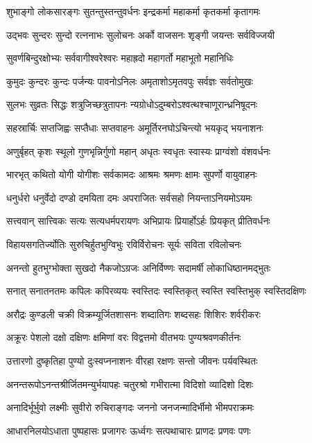 \twolineshloka
{शुभाङ्गो लोकसारङ्गः सुतन्तुस्तन्तुवर्धनः}
{इन्द्रकर्मा महाकर्मा कृतकर्मा कृतागमः}

\twolineshloka
{उद्भवः सुन्दरः सुन्दो रत्ननाभः सुलोचनः}
{अर्को वाजसनः शृङ्गी जयन्तः सर्वविज्जयी}

\twolineshloka
{सुवर्णबिन्दुरक्षोभ्यः सर्ववागीश्वरेश्वरः}
{महाह्रदो महागर्तो महाभूतो महानिधिः}

\twolineshloka
{कुमुदः कुन्दरः कुन्दः पर्जन्यः पावनोऽनिलः}
{अमृताशोऽमृतवपुः सर्वज्ञः सर्वतोमुखः}

\twolineshloka
{सुलभः सुव्रतः सिद्धः शत्रुजिच्छत्रुतापनः}
{न्यग्रोधोऽदुम्बरोऽश्वत्थश्चाणूरान्ध्रनिषूदनः}

\twolineshloka
{सहस्रार्चिः सप्तजिह्वः सप्तैधाः सप्तवाहनः}
{अमूर्तिरनघोऽचिन्त्यो भयकृद् भयनाशनः}

\twolineshloka
{अणुर्बृहत् कृशः स्थूलो गुणभृन्निर्गुणो महान्}
{अधृतः स्वधृतः स्वास्यः प्राग्वंशो वंशवर्धनः}

\twolineshloka
{भारभृत् कथितो योगी योगीशः सर्वकामदः}
{आश्रमः श्रमणः क्षामः सुपर्णो वायुवाहनः}

\twolineshloka
{धनुर्धरो धनुर्वेदो दण्डो दमयिता दमः}
{अपराजितः सर्वसहो नियन्ताऽनियमोऽयमः}

\twolineshloka
{सत्त्ववान् सात्त्विकः सत्यः सत्यधर्मपरायणः}
{अभिप्रायः प्रियार्होऽर्हः प्रियकृत् प्रीतिवर्धनः}

\twolineshloka
{विहायसगतिर्ज्योतिः सुरुचिर्हुतभुग्विभुः}
{रविर्विरोचनः सूर्यः सविता रविलोचनः}

\twolineshloka
{अनन्तो हुतभुग्भोक्ता सुखदो नैकजोऽग्रजः}
{अनिर्विण्णः सदामर्षी लोकाधिष्ठानमद्भुतः}

\twolineshloka
{सनात् सनातनतमः कपिलः कपिरव्ययः}
{स्वस्तिदः स्वस्तिकृत् स्वस्ति स्वस्तिभुक् स्वस्तिदक्षिणः}

\twolineshloka
{अरौद्रः कुण्डली चक्री विक्रम्यूर्जितशासनः}
{शब्दातिगः शब्दसहः शिशिरः शर्वरीकरः}

\twolineshloka
{अक्रूरः पेशलो दक्षो दक्षिणः क्षमिणां वरः}
{विद्वत्तमो वीतभयः पुण्यश्रवणकीर्तनः}

\twolineshloka
{उत्तारणो दुष्कृतिहा पुण्यो दुःस्वप्ननाशनः}
{वीरहा रक्षणः सन्तो जीवनः पर्यवस्थितः}

\twolineshloka
{अनन्तरूपोऽनन्तश्रीर्जितमन्युर्भयापहः}
{चतुरश्रो गभीरात्मा विदिशो व्यादिशो दिशः}

\twolineshloka
{अनादिर्भूर्भुवो लक्ष्मीः सुवीरो रुचिराङ्गदः}
{जननो जनजन्मादिर्भीमो भीमपराक्रमः}

\twolineshloka
{आधारनिलयोऽधाता पुष्पहासः प्रजागरः}
{ऊर्ध्वगः सत्पथाचारः प्राणदः प्रणवः पणः}

